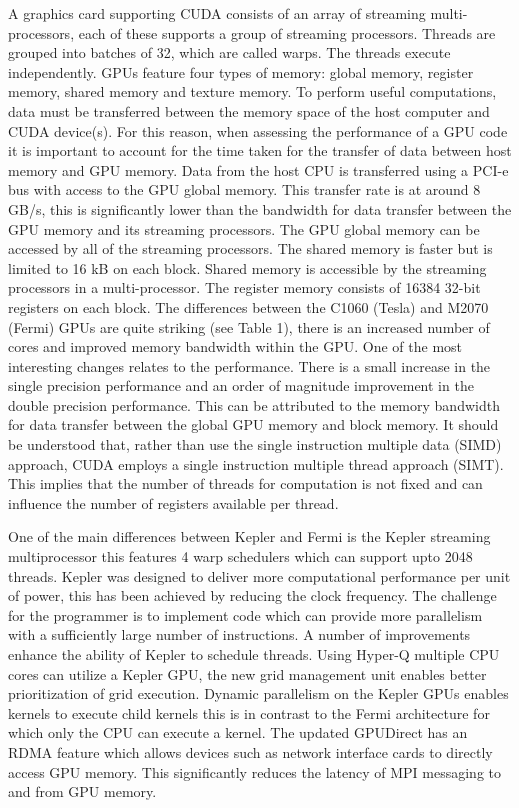 \documentclass[final,1p]{elsarticle}
\begin{document}
A graphics card supporting CUDA consists of an array of streaming multi-processors, each of these supports a group of streaming processors. Threads are grouped into batches of 32, which are called warps. The threads execute independently. GPUs feature four types of memory: global memory, register memory, shared memory and texture memory. To perform useful computations, data must be transferred between the memory space of the host computer and CUDA device(s). For this reason, when assessing the performance of a GPU code it is important to account for the time taken for the transfer of data between host memory and GPU memory. Data from the host CPU is transferred using a PCI-e bus with access to the GPU global memory. This transfer rate is at around 8 GB/s, this is significantly lower than the bandwidth for data transfer between the GPU memory and its streaming processors. The GPU global memory can be accessed by all of the streaming processors. The shared  memory is faster but is limited to 16 kB on each block. Shared memory is accessible by the streaming processors in a multi-processor. The register memory consists of 16384 32-bit registers on each  block. The differences between the C1060 (Tesla) and  M2070 (Fermi) GPUs are quite striking (see Table 1), there is an increased number of cores and improved memory bandwidth within the GPU. One of the most interesting changes relates to the performance. There is a small increase in the single precision performance and an order of magnitude improvement in the double precision performance. This can be attributed to the memory bandwidth for data transfer between the global GPU memory and block memory. It should be understood that, rather than use the single instruction multiple data (SIMD) approach, CUDA employs a single instruction multiple thread approach (SIMT). This implies that the number of threads for computation is not fixed  and can influence the number of registers available per thread.

One of the main differences between Kepler and Fermi is the Kepler streaming multiprocessor this features 4 warp schedulers which can support upto 2048 threads.  Kepler was designed to deliver more computational performance per unit of power, this has been achieved by reducing the clock frequency. The challenge for the programmer is to implement code which can provide more parallelism with a sufficiently large number of instructions. A number of improvements enhance the ability of Kepler to schedule threads. Using Hyper-Q multiple CPU cores can utilize a Kepler GPU, the new grid management unit enables better prioritization of grid execution. Dynamic parallelism on the Kepler GPUs enables kernels to execute child kernels this is in contrast to the Fermi architecture for which only the CPU can execute a kernel. The updated GPUDirect has an RDMA feature which allows devices such as network interface cards to directly access GPU memory. This significantly reduces the latency of MPI messaging to and from GPU memory.
\end{document}
